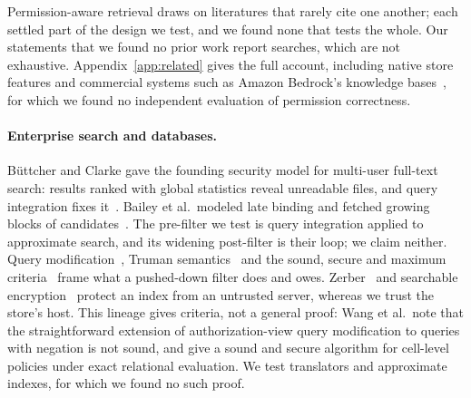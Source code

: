
Permission-aware retrieval draws on literatures that rarely cite one another; each settled part of the design we test, and we found none that tests the whole. Our statements that we found no prior work report
searches, which are not exhaustive. Appendix~\ref{app:related} gives the full account, including native store features and commercial systems such as
Amazon Bedrock's knowledge bases~\cite{aws2026access}, for which we found no independent evaluation of permission correctness.

\paragraph{Enterprise search and databases.}
B\"{u}ttcher and Clarke gave the founding security model for multi-user full-text search: results ranked with global statistics reveal
unreadable files, and query integration fixes it~\cite{buttcher2005security}. Bailey et al.\ modeled late binding and fetched growing
blocks of candidates~\cite{bailey2006secure}. The pre-filter we test is query integration applied to approximate search, and its widening
post-filter is their loop; we claim neither. Query modification~\cite{stonebraker1974access}, Truman semantics~\cite{rizvi2004extending} and
the sound, secure and maximum criteria~\cite{wang2007correctness} frame what a pushed-down filter does and owes. Zerber~\cite{zerr2008zerber}
and searchable encryption~\cite{song2000practical} protect an index from an untrusted server, whereas we trust the store's host. This lineage
gives criteria, not a general proof: Wang et al.\ note that the straightforward extension of authorization-view query modification to queries with negation is not sound, and give a sound and secure algorithm for cell-level policies under exact relational evaluation. We test
translators and approximate indexes, for which we found no such proof.

